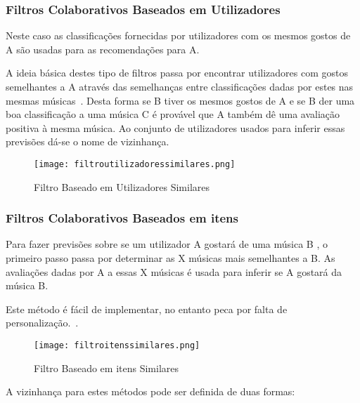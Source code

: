 \subsubsection{ Filtros Colaborativos Baseados em Utilizadores}
\par\hfill
 \par Neste caso as classificações fornecidas por utilizadores com os mesmos gostos de A são usadas para as recomendações para A. 

 \par A ideia básica destes tipo de filtros passa por encontrar utilizadores com gostos semelhantes a A através das semelhanças entre classificações dadas por estes nas mesmas músicas~\cite{ref_book2}. Desta forma se B tiver os mesmos gostos de A e se B der uma boa classificação a uma música C é provável que A também dê uma avaliação positiva à mesma música. Ao conjunto de utilizadores usados para inferir essas previsões dá-se o nome de vizinhança.

\begin{figure}[H]

  \centering

  \texttt{[image: filtroutilizadoressimilares.png]}

  \caption {Filtro Baseado em Utilizadores Similares}

  \label {fig01}

\end{figure}



\subsubsection{ Filtros Colaborativos Baseados em itens}
\par\hfill
 \par Para fazer previsões sobre se um utilizador A gostará de uma música B , o primeiro passo passa por determinar as X músicas mais semelhantes a B. As avaliações dadas por A a essas X músicas é usada para inferir se A gostará da música B.

 \par Este método é fácil de implementar, no entanto peca por falta de personalização.~\cite{ref_article1}.

\begin{figure}[H]

  \centering

  \texttt{[image: filtroitenssimilares.png]}

  \caption{Filtro Baseado em itens Similares}

  \label{fig02}

\end{figure}
\par A vizinhança para estes métodos pode ser definida de duas formas:



